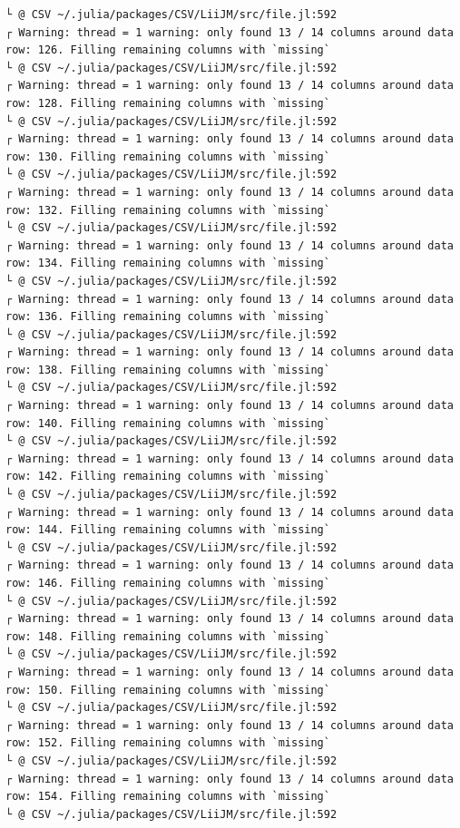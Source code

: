 \documentclass[
  letterpaper,
  DIV=11,
  numbers=noendperiod]{scrartcl}
\begin{document}
\begin{verbatim}
└ @ CSV ~/.julia/packages/CSV/LiiJM/src/file.jl:592
┌ Warning: thread = 1 warning: only found 13 / 14 columns around data row: 126. Filling remaining columns with `missing`
└ @ CSV ~/.julia/packages/CSV/LiiJM/src/file.jl:592
┌ Warning: thread = 1 warning: only found 13 / 14 columns around data row: 128. Filling remaining columns with `missing`
└ @ CSV ~/.julia/packages/CSV/LiiJM/src/file.jl:592
┌ Warning: thread = 1 warning: only found 13 / 14 columns around data row: 130. Filling remaining columns with `missing`
└ @ CSV ~/.julia/packages/CSV/LiiJM/src/file.jl:592
┌ Warning: thread = 1 warning: only found 13 / 14 columns around data row: 132. Filling remaining columns with `missing`
└ @ CSV ~/.julia/packages/CSV/LiiJM/src/file.jl:592
┌ Warning: thread = 1 warning: only found 13 / 14 columns around data row: 134. Filling remaining columns with `missing`
└ @ CSV ~/.julia/packages/CSV/LiiJM/src/file.jl:592
┌ Warning: thread = 1 warning: only found 13 / 14 columns around data row: 136. Filling remaining columns with `missing`
└ @ CSV ~/.julia/packages/CSV/LiiJM/src/file.jl:592
┌ Warning: thread = 1 warning: only found 13 / 14 columns around data row: 138. Filling remaining columns with `missing`
└ @ CSV ~/.julia/packages/CSV/LiiJM/src/file.jl:592
┌ Warning: thread = 1 warning: only found 13 / 14 columns around data row: 140. Filling remaining columns with `missing`
└ @ CSV ~/.julia/packages/CSV/LiiJM/src/file.jl:592
┌ Warning: thread = 1 warning: only found 13 / 14 columns around data row: 142. Filling remaining columns with `missing`
└ @ CSV ~/.julia/packages/CSV/LiiJM/src/file.jl:592
┌ Warning: thread = 1 warning: only found 13 / 14 columns around data row: 144. Filling remaining columns with `missing`
└ @ CSV ~/.julia/packages/CSV/LiiJM/src/file.jl:592
┌ Warning: thread = 1 warning: only found 13 / 14 columns around data row: 146. Filling remaining columns with `missing`
└ @ CSV ~/.julia/packages/CSV/LiiJM/src/file.jl:592
┌ Warning: thread = 1 warning: only found 13 / 14 columns around data row: 148. Filling remaining columns with `missing`
└ @ CSV ~/.julia/packages/CSV/LiiJM/src/file.jl:592
┌ Warning: thread = 1 warning: only found 13 / 14 columns around data row: 150. Filling remaining columns with `missing`
└ @ CSV ~/.julia/packages/CSV/LiiJM/src/file.jl:592
┌ Warning: thread = 1 warning: only found 13 / 14 columns around data row: 152. Filling remaining columns with `missing`
└ @ CSV ~/.julia/packages/CSV/LiiJM/src/file.jl:592
┌ Warning: thread = 1 warning: only found 13 / 14 columns around data row: 154. Filling remaining columns with `missing`
└ @ CSV ~/.julia/packages/CSV/LiiJM/src/file.jl:592

\end{verbatim}
\end{document}
